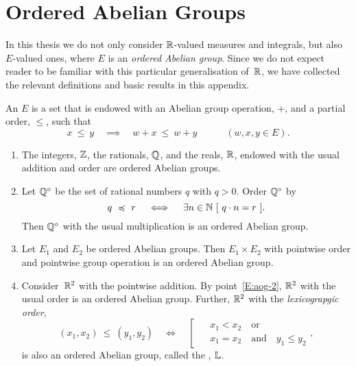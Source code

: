 \documentclass[main.tex]{subfiles}
\begin{document}
\section{Ordered Abelian Groups}
\label{S:ag}
\noindent
In this thesis
we do not only consider $\mathbb{R}$-valued measures and integrals,
but also~$E$-valued ones, 
where $E$ is an \emph{ordered Abelian group}.
Since we do not expect reader to be familiar with this
particular generalisation of~$\mathbb{R}$,
we have collected the relevant definitions
and basic results in this appendix.
\begin{dfn}
\label{D:oag}
An  $E$
is a set that is endowed with an Abelian group operation, $+$,
and a partial order, $\leq$, 
such that 
\begin{equation*}
x \ \leq\ y \quad\implies\quad w+x \ \leq\ w+y
\qquad\quad(w,x,y\in E).
\end{equation*}
\end{dfn}
%
%
\begin{exs}
\label{E:oag}
\begin{enumerate}
\item
\label{E:aog-1}
The integers, $\mathbb{Z}$, the rationals, $\mathbb{Q}$, and the reals, $\mathbb{R}$,
endowed with  the usual addition and order
are ordered Abelian groups.

\item
\label{E:oag_div}
Let
$\mathbb{Q}^{\circ}$
be the set of rational numbers $q$ with $q>0$.
Order $\mathbb{Q}^\circ$ by
\begin{equation*}
q \ \preccurlyeq \ r
\quad\iff\quad 
\exists n\in \mathbb{N} \ [\ q \cdot n = r \ ].
\end{equation*}
Then $\mathbb{Q}^\circ$ with 
the usual multiplication is an  ordered Abelian group.

\item
\label{E:aog-2}
Let $E_1$ and $E_2$ be ordered Abelian groups.
Then $E_1\times E_2$ with pointwise order
and pointwise group operation is an ordered Abelian group.

\item
\label{E:oag_lex}
Consider~$\mathbb{R}^2$ with the pointwise addition.
By point~\ref{E:aog-2},
$\mathbb{R}^2$ with the usual order
is an  ordered Abelian group.
Further,
$\mathbb{R}^2$ with the
 \emph{lexicograpgic order},
\begin{equation*}
(x_1,x_2)\ \leq\ (y_1,y_2)
\quad\iff\quad
\left[ \ \ 
\begin{alignedat}{3}
&x_1 < x_2 \quad\text{or}\\
&x_1 = x_2  \quad\text{and}\quad  y_1 \leq y_2 
\end{alignedat}
\right.,
\end{equation*}
is also an ordered Abelian group,
called the ,
 $\mathbb{L}$.
\end{enumerate}
\end{exs}
\end{document}
